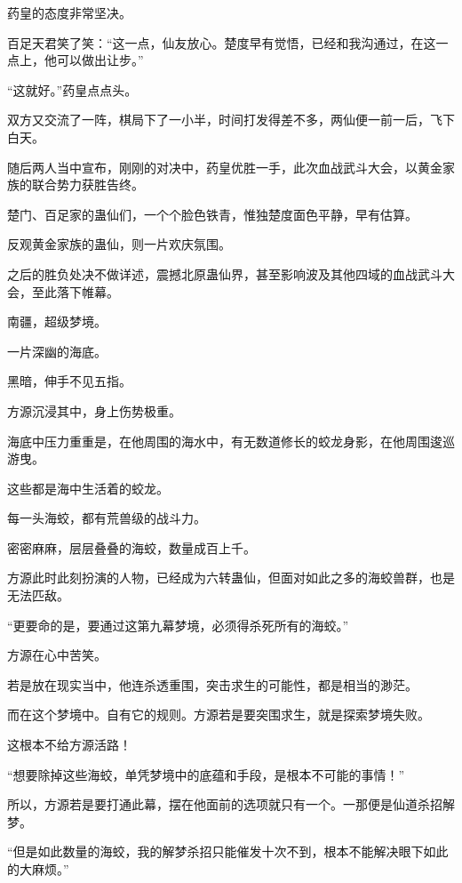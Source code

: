 
\begin{this_body}

药皇的态度非常坚决。

百足天君笑了笑：“这一点，仙友放心。楚度早有觉悟，已经和我沟通过，在这一点上，他可以做出让步。”

“这就好。”药皇点点头。

双方又交流了一阵，棋局下了一小半，时间打发得差不多，两仙便一前一后，飞下白天。

随后两人当中宣布，刚刚的对决中，药皇优胜一手，此次血战武斗大会，以黄金家族的联合势力获胜告终。

楚门、百足家的蛊仙们，一个个脸色铁青，惟独楚度面色平静，早有估算。

反观黄金家族的蛊仙，则一片欢庆氛围。

之后的胜负处决不做详述，震撼北原蛊仙界，甚至影响波及其他四域的血战武斗大会，至此落下帷幕。

南疆，超级梦境。

一片深幽的海底。

黑暗，伸手不见五指。

方源沉浸其中，身上伤势极重。

海底中压力重重是，在他周围的海水中，有无数道修长的蛟龙身影，在他周围逡巡游曳。

这些都是海中生活着的蛟龙。

每一头海蛟，都有荒兽级的战斗力。

密密麻麻，层层叠叠的海蛟，数量成百上千。

方源此时此刻扮演的人物，已经成为六转蛊仙，但面对如此之多的海蛟兽群，也是无法匹敌。

“更要命的是，要通过这第九幕梦境，必须得杀死所有的海蛟。”

方源在心中苦笑。

若是放在现实当中，他连杀透重围，突击求生的可能性，都是相当的渺茫。

而在这个梦境中。自有它的规则。方源若是要突围求生，就是探索梦境失败。

这根本不给方源活路！

“想要除掉这些海蛟，单凭梦境中的底蕴和手段，是根本不可能的事情！”

所以，方源若是要打通此幕，摆在他面前的选项就只有一个。一那便是仙道杀招解梦。

“但是如此数量的海蛟，我的解梦杀招只能催发十次不到，根本不能解决眼下如此的大麻烦。”


\end{this_body}
